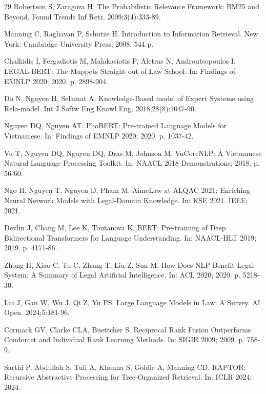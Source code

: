 \begin{thebibliography}{29}
Robertson S, Zaragoza H. The Probabilistic Relevance Framework: BM25 and Beyond. Found Trends Inf Retr. 2009;3(4):333-89.

Manning C, Raghavan P, Schutze H. Introduction to Information Retrieval. New York: Cambridge University Press; 2008. 544 p.

Chalkidis I, Fergadiotis M, Malakasiotis P, Aletras N, Androutsopoulos I. LEGAL-BERT: The Muppets Straight out of Law School. In: Findings of EMNLP 2020; 2020. p. 2898-904.

Do N, Nguyen H, Selamat A. Knowledge-Based model of Expert Systems using Rela-model. Int J Softw Eng Knowl Eng. 2018;28(8):1047-90.

Nguyen DQ, Nguyen AT. PhoBERT: Pre-trained Language Models for Vietnamese. In: Findings of EMNLP 2020; 2020. p. 1037-42.

Vu T, Nguyen DQ, Nguyen DQ, Dras M, Johnson M. VnCoreNLP: A Vietnamese Natural Language Processing Toolkit. In: NAACL 2018 Demonstrations; 2018. p. 56-60.

Ngo H, Nguyen T, Nguyen D, Pham M. AimeLaw at ALQAC 2021: Enriching Neural Network Models with Legal-Domain Knowledge. In: KSE 2021. IEEE; 2021.

Devlin J, Chang M, Lee K, Toutanova K. BERT: Pre-training of Deep Bidirectional Transformers for Language Understanding. In: NAACL-HLT 2019; 2019. p. 4171-86.

Zhong H, Xiao C, Tu C, Zhang T, Liu Z, Sun M. How Does NLP Benefit Legal System: A Summary of Legal Artificial Intelligence. In: ACL 2020; 2020. p. 5218-30.

Lai J, Gan W, Wu J, Qi Z, Yu PS. Large Language Models in Law: A Survey. AI Open. 2024;5:181-96.

Cormack GV, Clarke CLA, Buettcher S. Reciprocal Rank Fusion Outperforms Condorcet and Individual Rank Learning Methods. In: SIGIR 2009; 2009. p. 758-9.

Sarthi P, Abdullah S, Tuli A, Khanna S, Goldie A, Manning CD. RAPTOR: Recursive Abstractive Processing for Tree-Organized Retrieval. In: ICLR 2024; 2024.

\end{thebibliography}
